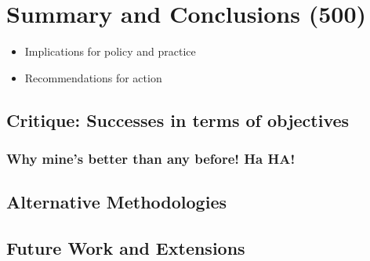 \chapter{Summary and Conclusions (500)}
\begin{itemize}
	\item Implications for policy and practice
	\item Recommendations for action
\end{itemize}
\section{Critique: Successes in terms of objectives}
\subsection{Why mine's better than any before! Ha HA!}
\section{Alternative Methodologies}
\section{Future Work and Extensions}

